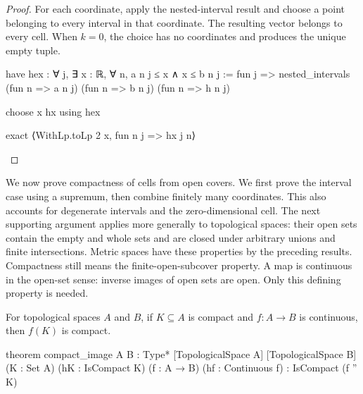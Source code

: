 \begin{proof}
  For each coordinate, apply the nested-interval result and choose a point belonging to every
  interval in that coordinate.
  The resulting vector belongs to every cell.
  When $k=0$, the choice has no coordinates and produces the unique empty tuple.

  \begin{lean}
    have hex : ∀ j, ∃ x : ℝ, ∀ n, a n j ≤ x ∧ x ≤ b n j :=
      fun j => nested_intervals (fun n => a n j) (fun n => b n j) (fun n => h n j)

    choose x hx using hex

    exact ⟨WithLp.toLp 2 x, fun n j => hx j n⟩
  \end{lean}

\end{proof}

We now prove compactness of cells from open covers.
We first prove the interval case using a supremum, then combine finitely many coordinates.
This also accounts for degenerate intervals and the zero-dimensional cell.
The next supporting argument applies more generally to topological spaces: their open sets contain
the empty and whole sets and are closed under arbitrary unions and finite intersections.
Metric spaces have these properties by the preceding results.
Compactness still means the finite-open-subcover property.
A map is continuous in the open-set sense: inverse images of open sets are open.
Only this defining property is needed.

\begin{lemma}
  \label{an1:lem:compact-image}
  For topological spaces $A$ and $B$, if $K\subseteq A$ is compact and $f:A\to B$ is continuous,
  then $f(K)$ is compact.

  \begin{lean}
    theorem compact_image {A B : Type*} [TopologicalSpace A] [TopologicalSpace B]
        (K : Set A) (hK : IsCompact K) (f : A → B) (hf : Continuous f) :
        IsCompact (f '' K)
  \end{lean}
\end{lemma}

